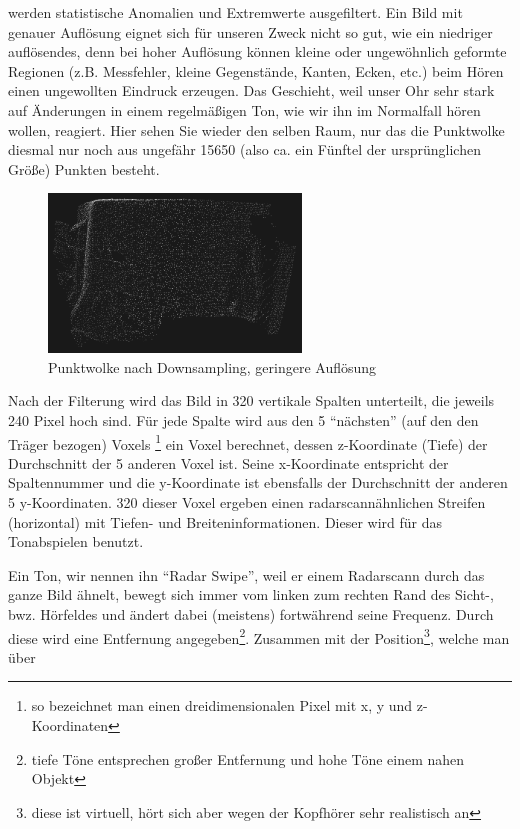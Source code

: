 \documentclass[a4paper,12pt,ngerman]{scrartcl}
\begin{document}
werden statistische Anomalien und Extremwerte ausgefiltert. Ein Bild mit genauer Auflösung eignet sich für unseren Zweck nicht so gut, wie ein niedriger
auflösendes, denn bei hoher Auflösung können kleine oder ungewöhnlich geformte Regionen (z.B. Messfehler, kleine Gegenstände, Kanten, Ecken, etc.) beim Hören
einen ungewollten Eindruck erzeugen. Das Geschieht, weil unser Ohr sehr stark auf 
Änderungen in einem regelmäßigen Ton, wie wir ihn im Normalfall hören wollen, reagiert. 
Hier sehen Sie wieder den selben Raum, nur das die Punktwolke diesmal nur noch aus ungefähr 15650 (also ca. ein Fünftel der ursprünglichen Größe) Punkten besteht. 
\begin{figure}[h]
	\centering
	\includegraphics[width=0.6\textwidth]{pointcloud_nach_downsampling_15650_punkte}
	\caption{Punktwolke nach Downsampling, geringere Auflösung}
	\label{after_downsampling}
\end{figure}
\par 
Nach der Filterung wird das Bild in 320 vertikale Spalten unterteilt, die jeweils 240 Pixel hoch sind. 
Für jede Spalte wird aus den 5 \enquote{nächsten} (auf den den Träger bezogen) Voxels 
\footnote{so bezeichnet man einen dreidimensionalen Pixel mit x, y und z-Koordinaten} ein Voxel berechnet,
dessen z-Koordinate (Tiefe) der Durchschnitt der 5 anderen Voxel ist. Seine x-Koordinate entspricht
der Spaltennummer und die y-Koordinate ist ebensfalls der Durchschnitt der anderen 5 y-Koordinaten. 
320 dieser Voxel ergeben einen radarscannähnlichen Streifen (horizontal) mit Tiefen- und 
Breiteninformationen. Dieser wird für das Tonabspielen benutzt.\par 
Ein Ton, wir nennen ihn \enquote{Radar Swipe}, weil er einem Radarscann durch das ganze Bild ähnelt, 
bewegt sich immer vom linken zum rechten Rand des Sicht-, bwz. Hörfeldes und ändert dabei (meistens) fortwährend
seine Frequenz. Durch diese wird eine Entfernung angegeben\footnote{tiefe Töne entsprechen großer 
	Entfernung und hohe Töne einem nahen Objekt}. Zusammen mit der Position\footnote{diese ist virtuell,
	hört sich aber wegen der Kopfhörer sehr realistisch an}, welche man über
\end{document}
